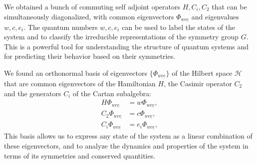 We obtained a bunch of commuting self adjoint operators \(H, C_i, C_2\) that can be simultaneously diagonalized, with common eigenvectors \(\Phi_{w c \underline{e}}\) and eigenvalues \(w, c, e_i\). The quantum numbers \(w, c, e_i\) can be used to label the states of the system and to classify the irreducible representations of the symmetry group \(G\). This is a powerful tool for understanding the structure of quantum systems and for predicting their behavior based on their symmetries.

We found an orthonormal basis of eigenvectors \(\{\Phi_{w c \underline{e}}\}\) of the Hilbert space \(\mathcal{H}\) that are common eigenvectors of the Hamiltonian \(H\), the Casimir operator \(C_2\) and the generators \(C_i\) of the Cartan subalgebra:
\[
    \begin{aligned}
        H \Phi_{w c \underline{e}}   & = w \Phi_{w c \underline{e}},   \\
        C_2 \Phi_{w c \underline{e}} & = c \Phi_{w c \underline{e}},   \\
        C_i \Phi_{w c \underline{e}} & = e_i \Phi_{w c \underline{e}},
    \end{aligned}
\]
This basis allows us to express any state of the system as a linear combination of these eigenvectors, and to analyze the dynamics and properties of the system in terms of its symmetries and conserved quantities.

